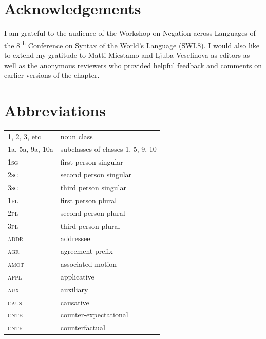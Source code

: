\documentclass[output=paper,colorlinks=true, citecolor=brown,draftmode]{langscibook}
\begin{document}
\section*{Acknowledgements}
I am grateful to the audience of the Workshop on Negation across Languages of the 8\textsuperscript{th} Conference on Syntax of the World’s Language (SWL8). I would also like to extend my gratitude to Matti Miestamo and Ljuba Veselinova as editors as well as the anonymous reviewers who provided helpful feedback and comments on earlier versions of the chapter. 







\section*{Abbreviations}
\begin{tabularx}{.54\textwidth}{lQ}
1, 2, 3, etc & noun class \\
 1a, 5a, 9a, 10a & subclasses of classes 1, 5, 9, 10\\
\scshape 1sg & first person singular \\ 
\scshape 2sg & second person singular \\ 
\scshape 3sg & third person singular \\ 
\scshape 1pl & first person plural \\ 
\scshape 2pl & second person plural\\ 
\scshape 3pl & third person plural \\ 
\scshape addr & addressee \\
\scshape agr & agreement prefix\\
\scshape amot & associated motion \\
\scshape appl & applicative \\
\scshape aux & auxiliary  \\
\scshape caus & causative \\
\scshape cnte & counter-expectational \\
\scshape cntf & counterfactual \\
\end{tabularx}
\end{document}
